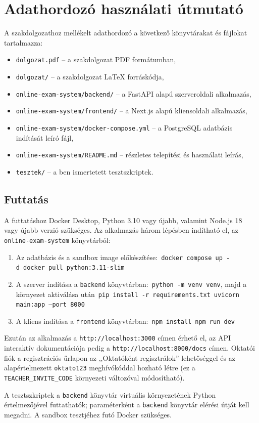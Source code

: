 \pagestyle{empty}

\section*{Adathordozó használati útmutató}

A szakdolgozathoz mellékelt adathordozó a következő könyvtárakat és fájlokat tartalmazza:
\begin{itemize}
\item \texttt{dolgozat.pdf} -- a szakdolgozat PDF formátumban,
\item \texttt{dolgozat/} -- a szakdolgozat \LaTeX{} forráskódja,
\item \texttt{online-exam-system/backend/} -- a FastAPI alapú szerveroldali alkalmazás,
\item \texttt{online-exam-system/frontend/} -- a Next.js alapú kliensoldali alkalmazás,
\item \texttt{online-exam-system/docker-compose.yml} -- a PostgreSQL adatbázis indítását leíró fájl,
\item \texttt{online-exam-system/README.md} -- részletes telepítési és használati leírás,
\item \texttt{tesztek/} -- a ben ismertetett tesztszkriptek.
\end{itemize}

\subsection*{Futtatás}

A futtatáshoz Docker Desktop, Python 3.10 vagy újabb, valamint Node.js 18 vagy újabb verzió
szükséges. Az alkalmazás három lépésben indítható el, az \texttt{online-exam-system} könyvtárból:
\begin{enumerate}
\item Az adatbázis és a sandbox image előkészítése:\
  \texttt{docker compose up -d}\
  \texttt{docker pull python:3.11-slim}
\item A szerver indítása a \texttt{backend} könyvtárban:\
  \texttt{python -m venv venv}, majd a környezet aktiválása után\
  \texttt{pip install -r requirements.txt}\
  \texttt{uvicorn main:app --port 8000}
\item A kliens indítása a \texttt{frontend} könyvtárban:\
  \texttt{npm install}\
  \texttt{npm run dev}
\end{enumerate}
Ezután az alkalmazás a \texttt{http://localhost:3000} címen érhető el, az API interaktív
dokumentációja pedig a \texttt{http://localhost:8000/docs} címen. Oktatói fiók a regisztrációs
űrlapon az ,,Oktatóként regisztrálok'' lehetőséggel és az alapértelmezett \texttt{oktato123}
meghívókóddal hozható létre (ez a \texttt{TEACHER\_INVITE\_CODE} környezeti változóval
módosítható).

A tesztszkriptek a \texttt{backend} könyvtár virtuális környezetének Python értelmezőjével
futtathatók; paraméterként a \texttt{backend} könyvtár elérési útját kell megadni. A sandbox
tesztjéhez futó Docker szükséges.
